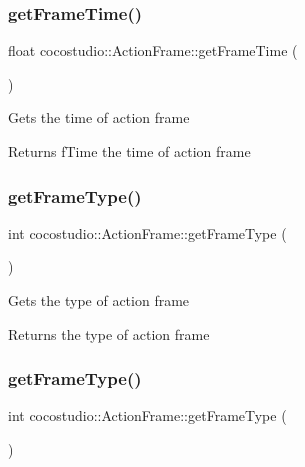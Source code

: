 \subsubsection{\texorpdfstring{get\+Frame\+Time()}{getFrameTime()}\hspace{0.1cm}{\footnotesize\ttfamily [2/2]}}
{\footnotesize\ttfamily float cocostudio\+::\+Action\+Frame\+::get\+Frame\+Time (\begin{DoxyParamCaption}{ }\end{DoxyParamCaption})}

Gets the time of action frame

\begin{DoxyReturn}{Returns}
f\+Time the time of action frame 
\end{DoxyReturn}
\mbox{\label{classcocostudio_1_1ActionFrame_a6dcd7610871fcbef3ed3806e56cd790a}} 
\subsubsection{\texorpdfstring{get\+Frame\+Type()}{getFrameType()}\hspace{0.1cm}{\footnotesize\ttfamily [1/2]}}
{\footnotesize\ttfamily int cocostudio\+::\+Action\+Frame\+::get\+Frame\+Type (\begin{DoxyParamCaption}{ }\end{DoxyParamCaption})}

Gets the type of action frame

\begin{DoxyReturn}{Returns}
the type of action frame 
\end{DoxyReturn}
\mbox{\label{classcocostudio_1_1ActionFrame_a6dcd7610871fcbef3ed3806e56cd790a}} 
\subsubsection{\texorpdfstring{get\+Frame\+Type()}{getFrameType()}\hspace{0.1cm}{\footnotesize\ttfamily [2/2]}}
{\footnotesize\ttfamily int cocostudio\+::\+Action\+Frame\+::get\+Frame\+Type (\begin{DoxyParamCaption}{ }\end{DoxyParamCaption})}

